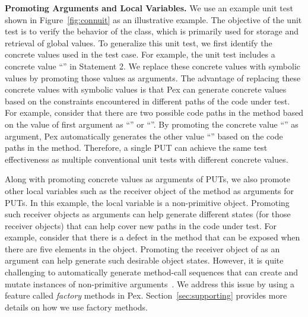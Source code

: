 \textbf{Promoting Arguments and Local Variables.} We use an example unit test  shown in Figure~\ref{fig:connuit} as an illustrative example. The objective of the unit test is to verify the behavior of the  class, which is primarily used for storage and retrieval of global values. To generalize this unit test, we first identify the concrete values used in the test case. For example, the unit test includes a concrete  value ``'' in Statement 2. We replace these concrete values with symbolic values by promoting those values as arguments. The advantage of replacing these concrete values with symbolic values is that Pex can generate concrete values based on the constraints encountered in different paths of the code under test. For example, consider that there are two possible code paths in the  method based on the value of first argument as ``'' or ``''. By promoting the concrete value ``'' as argument, Pex automatically generates the other value ``'' based on the code paths in the  method. Therefore, a single PUT can achieve the same test effectiveness as multiple conventional unit tests with different concrete values. 

Along with promoting concrete values as arguments of PUTs, we also promote other local variables such as the receiver object of the  method as arguments for PUTs. In this example, the local variable is a non-primitive object. Promoting such receiver objects as arguments can help generate different states (for those receiver objects) that can help cover new paths in the code under test. For example, consider that there is a defect in the  method that can be exposed when there are five elements in the  object. Promoting the receiver object of  as an argument can help generate such desirable object states. However, it is quite challenging to automatically generate method-call sequences that can create and mutate instances of non-primitive arguments~\cite{}. We address this issue by using a feature called \emph{factory} methods in Pex. Section~\ref{sec:supporting} provides more details on how we use factory methods.

